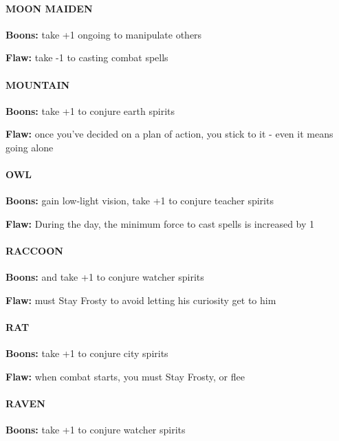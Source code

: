 \documentclass[oneside,10pt]{article}
\begin{document}
\begin{multicols}{2}
\paragraph{MOON MAIDEN}
\begin{dent}
\textbf{Boons:} take +1 ongoing to manipulate others

\textbf{Flaw:} take -1 to casting combat spells
\end{dent}

\paragraph{MOUNTAIN}
\begin{dent}
\textbf{Boons:} take +1 to conjure earth spirits

\textbf{Flaw:} once you've decided on a plan of action, you stick to it - even it means going alone
\end{dent}


\paragraph{OWL}
\begin{dent}
\textbf{Boons:} gain low-light vision, take +1 to conjure teacher
spirits

\textbf{Flaw:} During the day, the minimum force to cast spells is increased by 1
\end{dent}


\paragraph{RACCOON}
\begin{dent}
\textbf{Boons:} and take +1 to conjure watcher spirits

\textbf{Flaw:} must Stay Frosty to avoid letting his curiosity get to
him
\end{dent}


\paragraph{RAT}
\begin{dent}
\textbf{Boons:} take +1 to conjure city spirits

\textbf{Flaw:} when combat starts, you must Stay Frosty, or flee
\end{dent}


\paragraph{RAVEN}
\begin{dent}
\textbf{Boons:} take +1 to conjure watcher spirits


\end{dent}
\end{multicols}
\end{document}
